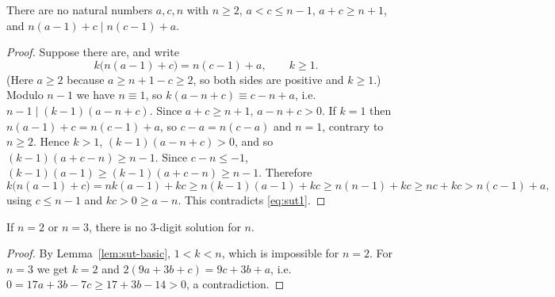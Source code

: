 \begin{lemma}\label{lem:sut-lemma1}
There are no natural numbers $a,c,n$ with
$n\ge2$, $a<c\le n-1$, $a+c\ge n+1$, and $n(a-1)+c\mid n(c-1)+a$.
\end{lemma}
\begin{proof}
Suppose there are, and write
\begin{equation}\label{eq:sut1}
k\bigl(n(a-1)+c\bigr)=n(c-1)+a,\qquad k\ge1 .
\end{equation}
(Here $a\ge2$ because $a\ge n+1-c\ge2$, so both sides are positive and $k\ge1$.) Modulo $n-1$ we have
$n\equiv1$, so $k(a-n+c)\equiv c-n+a$, i.e.\ $n-1\mid(k-1)(a-n+c)$. Since $a+c\ge n+1$, $a-n+c>0$. If
$k=1$ then $n(a-1)+c=n(c-1)+a$, so $c-a=n(c-a)$ and $n=1$, contrary to $n\ge2$. Hence $k>1$,
$(k-1)(a-n+c)>0$, and so $(k-1)(a+c-n)\ge n-1$. Since $c-n\le-1$, $(k-1)(a-1)\ge(k-1)(a+c-n)\ge n-1$.
Therefore
\[
k\bigl(n(a-1)+c\bigr)=nk(a-1)+kc\ge n(k-1)(a-1)+kc\ge n(n-1)+kc\ge nc+kc>n(c-1)+a,
\]
using $c\le n-1$ and $kc>0\ge a-n$. This contradicts \eqref{eq:sut1}.
\end{proof}

\begin{lemma}\label{lem:sut-lemma2}
If $n=2$ or $n=3$, there is no 3-digit solution for $n$.
\end{lemma}
\begin{proof}
By Lemma~\ref{lem:sut-basic}, $1<k<n$, which is impossible for $n=2$. For $n=3$ we get $k=2$ and
$2(9a+3b+c)=9c+3b+a$, i.e.\ $0=17a+3b-7c\ge17+3b-14>0$, a contradiction.
\end{proof}

